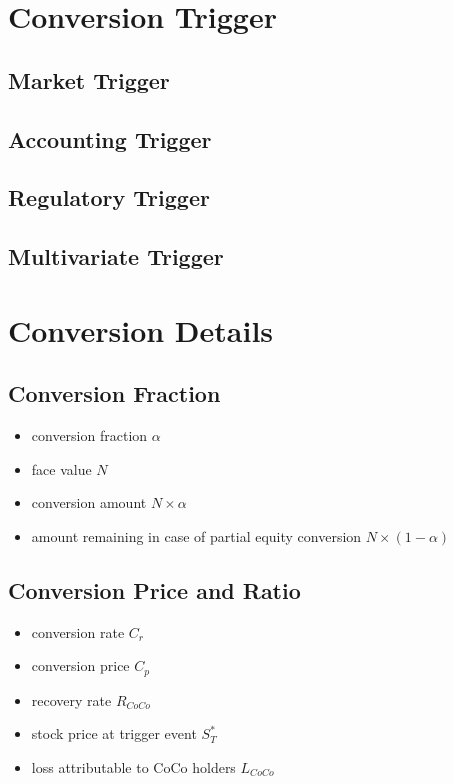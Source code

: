 \section{Conversion Trigger}

\subsection{Market Trigger}

\subsection{Accounting Trigger}

\subsection{Regulatory Trigger}

\subsection{Multivariate Trigger}

\section{Conversion Details}

\subsection{Conversion Fraction}

\begin{itemize}
    \item conversion fraction $\alpha$
    \item face value $N$
    \item conversion amount $N \times \alpha$
    \item amount remaining in case of partial equity conversion $N \times (1-\alpha)$
\end{itemize}

\subsection{Conversion Price and Ratio}
\begin{itemize}
    \item conversion rate $C_r$
    \item conversion price $C_p$
    \item recovery rate $R_{CoCo}$
    \item stock price at trigger event $S_T^{*}$
    \item loss attributable to CoCo holders $L_{CoCo}$
\end{itemize}

